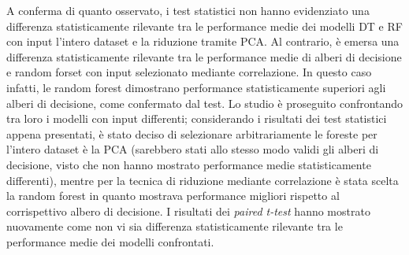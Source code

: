 A conferma di quanto osservato, i test statistici non hanno evidenziato una differenza statisticamente rilevante tra le performance medie dei modelli DT e RF con input l'intero dataset e la riduzione tramite PCA. Al contrario, è emersa una differenza statisticamente rilevante tra le performance medie di alberi di decisione e random forset con input selezionato mediante correlazione. In questo caso infatti, le random forest dimostrano performance statisticamente superiori agli alberi di decisione, come confermato dal test.
Lo studio è proseguito confrontando tra loro i modelli con input differenti; considerando i risultati dei test statistici appena presentati, è stato deciso di selezionare arbitrariamente le foreste per l'intero dataset è la PCA (sarebbero stati allo stesso modo validi gli alberi di decisione, visto che non hanno mostrato performance medie statisticamente differenti), mentre per la tecnica di riduzione mediante correlazione è stata scelta la random forest in quanto mostrava performance migliori rispetto al corrispettivo albero di decisione. I risultati dei \textit{paired t-test} hanno mostrato nuovamente come non vi sia differenza statisticamente rilevante tra le performance medie dei modelli confrontati.

